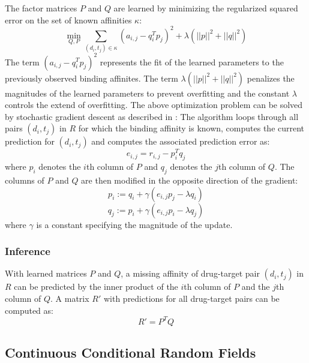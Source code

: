 The factor matrices $P$ and $Q$ are learned by minimizing the regularized squared error on the set of known affinities $\kappa$:
\begin{equation}
\min\limits_{Q,P}{\sum\limits_{(d_i,t_j)\in \kappa} (a_{i,j}-q_i^Tp_j)^2} + \lambda (||p||^2 + ||q||^2)
\end{equation}
The term $(a_{i,j}-q_i^Tp_j)^2$ represents the fit of the learned parameters to the previously observed binding affinites. The term $\lambda (||p||^2 + ||q||^2)$ penalizes the magnitudes of the learned parameters to prevent overfitting and the constant $\lambda$ controls the extend of overfitting.
The above optimization problem can be solved by stochastic gradient descent as described in \cite{Koren:2009:MFT:1608565.1608614}:
The algorithm loops through all pairs $(d_i, t_j)$ in $R$ for which the binding affinity is known, computes the current prediction for $(d_i, t_j)$ and computes the associated prediction error as:
\begin{equation}
e_{i,j} = r_{i,j} - p_i^Tq_j
\end{equation}
where $p_i$ denotes the $i$th column of $P$ and $q_j$ denotes the $j$th column of $Q$. The columns of $P$ and $Q$ are then modified in the opposite direction of the gradient:
\begin{equation}
p_i:= q_i + \gamma (e_{i,j} p_j - \lambda q_i)
\end{equation}
\begin{equation}
q_j:=p_i + \gamma (e_{i,j} p_i - \lambda q_j)
\end{equation}
where $\gamma$ is a constant specifying the magnitude of the update.

\subsubsection{Inference}

With learned matrices $P$ and $Q$, a missing affinity of drug-target pair $(d_i, t_j)$ in $R$ can be predicted by the inner product of the $i$th column of $P$ and the $j$th column of $Q$. A matrix $R'$ with predictions for all drug-target pairs can be computed as:
\begin{equation}
R' = P^TQ
\end{equation}

\subsection{Continuous Conditional Random Fields}
\label{sec:CCRF}

